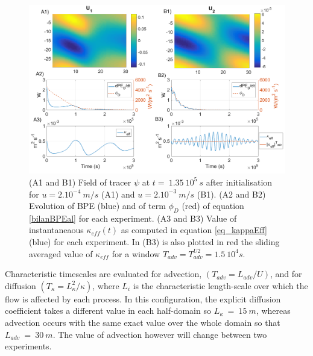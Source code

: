 \begin{figure}[h!]
\centering
\includegraphics[width=1\textwidth]{./CHAP_BPE/Fig_numlab_advdiff3.png}
\caption[Tracer field and evaluation of $\kappa_{eff}$ for configuration $BPE_{ts}$]{(A1 and B1) Field of tracer $\psi$ at $t= \ 1.35\ 10^5\ s$ after initialisation for $u=2.10^{-4} \ m/s$ (A1) and $u=2.10^{-3} \ m/s$ (B1). (A2 and B2) Evolution of BPE (blue) and of term $\phi_D$ (red) of equation \ref{bilanBPEal} for each experiment. (A3 and B3) Value of instantaneaous $\kappa_{eff} (t)$ as computed in equation \ref{eq_kappaEff} (blue) for each experiment. In (B3) is also plotted in red the sliding averaged value of $\kappa_{eff}$ for a window $T_{adv}=T_{adv}^{U2}=1.5\ 10^4 s$.}
\label{fig4numlab}
\end{figure}
Characteristic timescales are evaluated for advection, $(T_{adv}=L_{adv}/U)$, and for diffusion $(T_{\kappa}=L_{\kappa}^2/{\kappa})$, where $L_i$ is the characteristic length-scale over which the flow is affected by each process. In this configuration, the explicit diffusion coefficient takes a different value in each half-domain so $L_{\kappa}\ =\ 15\ m$, whereas advection occurs with the same exact value over the whole domain so that $L_{adv}\ =\ 30\ m$. The value of advection however will change between two experiments.

